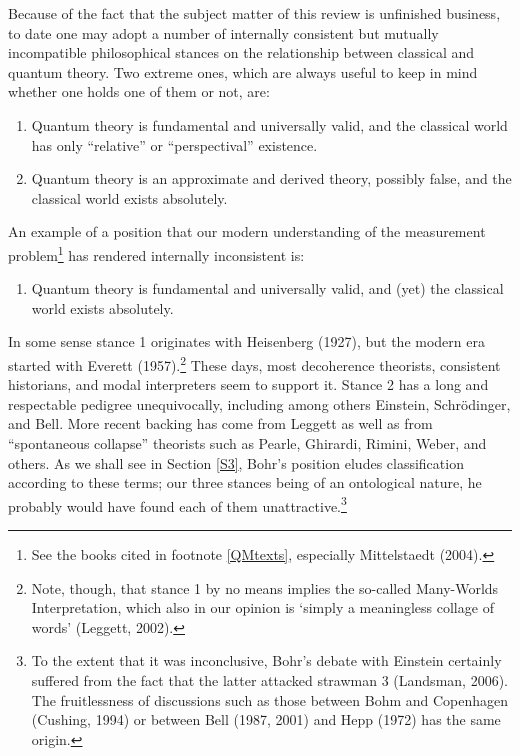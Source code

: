 \documentclass[12pt]{article}
\begin{document}
Because of the fact that the subject matter of this review is unfinished business, to date one may adopt a number of internally consistent but mutually incompatible philosophical stances on the relationship between classical and quantum theory. Two extreme ones, which are always useful to keep in mind whether one holds one of them or not, are:
\begin{enumerate}
\item Quantum theory is fundamental and universally valid, and the classical world has 
only ``relative'' or ``perspectival'' existence.
\item Quantum theory is an approximate and derived theory, possibly false, and the classical world exists absolutely.
\end{enumerate}
An example of a position that our modern understanding of the measurement problem\footnote{See the books cited in footnote \ref{QMtexts}, 
especially Mittelstaedt (2004).}  has rendered internally inconsistent is: 
\begin{enumerate}[resume]
  \item Quantum theory is fundamental and universally valid, and (yet) the classical world exists absolutely.
\end{enumerate}

\noindent
In some sense stance 1 originates with Heisenberg (1927), but the modern era started with
Everett (1957).\footnote{\label{MWM} Note, though,  that stance 1 by no means implies the so-called  Many-Worlds Interpretation, which also in our opinion is `simply a meaningless collage of words' (Leggett, 2002).} These days, most decoherence theorists, consistent historians,
and modal interpreters seem to support it. Stance 2 has a long and respectable pedigree unequivocally, including among others Einstein, Schr\"{o}dinger, and Bell. More recent backing has come from  Leggett as well as from ``spontaneous collapse'' theorists such as Pearle, Ghirardi, Rimini, Weber, and others.
As we shall see in Section \ref{S3},  Bohr's position eludes classification according to these terms; our three stances being of an ontological nature, he probably would have found each of them unattractive.\footnote{To the extent that it was inconclusive, Bohr's debate with Einstein certainly suffered from the fact that the latter attacked strawman 3 (Landsman, 2006).
The fruitlessness of discussions such as those between Bohm and Copenhagen (Cushing, 1994) or between  Bell (1987, 2001) and Hepp (1972) has the same origin.} 
\end{document}
